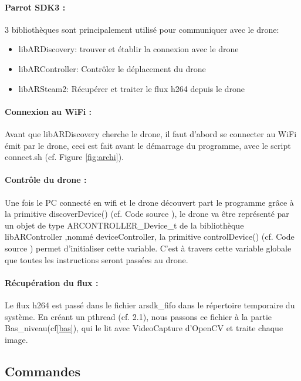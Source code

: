 \documentclass[12pt]{article}
\begin{document}
\paragraph*{Parrot SDK3 :}
3 bibliothèques sont principalement utilisé pour communiquer avec le drone: 
\begin{itemize}
    \item libARDiscovery: trouver et établir la connexion avec le drone
    \item libARController: Contrôler le déplacement du drone
    \item libARSteam2: Récupérer et traiter le flux h264 depuis le drone
\end{itemize}

\paragraph*{Connexion au WiFi :}
Avant que libARDiscovery cherche le drone, il faut d'abord se connecter au WiFi émit par le drone, ceci est fait avant le démarrage du programme, avec le script connect.sh (cf. Figure \ref{fig:archi}).
\paragraph*{Contrôle du drone :}
Une fois le PC connecté en wifi et le drone découvert part le programme grâce à la primitive discoverDevice() (cf. Code source \cite{git}), le drone va être représenté par un objet de type ARCONTROLLER\_Device\_t  de la bibliothèque libARController ,nommé deviceController, la primitive controlDevice() (cf. Code source \cite{git}) permet d'initialiser cette variable. C'est à travers cette variable globale que toutes les instructions seront passées au drone.

\paragraph*{Récupération du flux :}
Le flux h264 est passé dans le fichier arsdk\_fifo dans le répertoire temporaire du système. En créant un pthread (cf. 2.1), nous passons ce fichier à la partie Bas\_niveau(cf\ref{bas}), qui le lit avec VideoCapture d'OpenCV\cite{OpenCV} et traite chaque image.


\subsection{Commandes}
\end{document}
